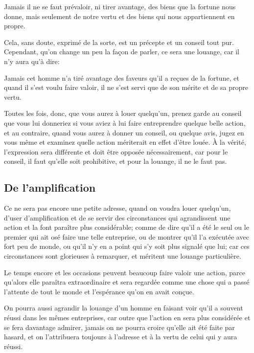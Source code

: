 \begin{emphpar}
	Jamais il ne se faut prévaloir, ni tirer avantage, des biens que la fortune nous donne, mais seulement de
	notre vertu et des biens qui nous appartiennent en propre.
\end{emphpar}

Cela, sans doute, exprimé de la sorte, est un précepte et un conseil tout pur. Cependant, qu'on change un peu
la façon de parler, ce sera une louange, car il n'y aura qu'à dire:

\begin{emphpar}
	Jamais cet homme n'a tiré avantage des faveurs qu'il a reçues de la fortune, et quand il s'est voulu faire
	valoir, il ne s'est servi que de son mérite et de sa propre vertu.
\end{emphpar}

Toutes les fois, donc, que vous aurez à louer quelqu'un, prenez garde au conseil que vous lui donneriez si vous
aviez à lui faire entreprendre quelque belle action, et au contraire, quand vous aurez à donner un conseil, ou
quelque avis, jugez en vous même et examinez quelle action mériterait en effet d'être louée. À la vérité, l'expression
sera différente et doit être opposée nécessairement, car pour le conseil, il faut qu'elle soit prohibitive, et
pour la louange, il ne le faut pas.

\subsection{De l'amplification}

Ce ne sera pas encore une petite adresse, quand on voudra louer quelqu'un, d'user d'amplification et de se servir
des circonstances qui agrandissent une action et la font paraître plus considérable; comme de dire qu'il a été le
seul ou le premier qui ait osé faire une telle entreprise, ou de montrer qu'il l'a exécutée avec fort peu de monde,
ou qu'il n'y en a point qui s'y soit plus signalé que lui; car ces circonstances sont glorieuses à remarquer, et
méritent une louange particulière.

\bigbreak

Le temps encore et les occasions peuvent beaucoup faire valoir une action, parce qu'alors elle paraîtra extraordinaire
et sera regardée comme une chose qui a passé l'attente de tout le monde et l'espérance qu'on en avait conçue.

\bigbreak

On pourra aussi agrandir la louange d'un homme en faisant voir qu'il a souvent réussi dans les mêmes entreprises, car
outre que l'action en sera plus considérée et se fera davantage admirer, jamais on ne pourra croire qu'elle ait été
faite par hasard, et on l'attribuera toujours à l'adresse et à la vertu de celui qui y aura réussi.

